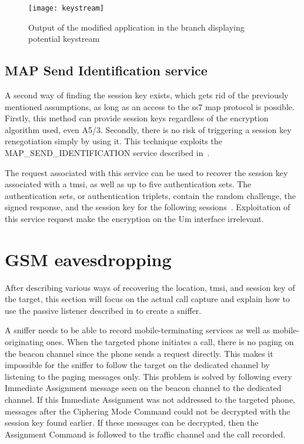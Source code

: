         \begin{figure}[h]
          \centering
          \texttt{[image: keystream]}
          \caption{Output of the modified  application
          in the  branch displaying potential
        keystream}
          \label{fig:keystream}
        \end{figure}

      \subsection{MAP Send Identification service}

        A second way of finding the session key exists, which gets rid of
        the previously mentioned assumptions, as long as an access to
        the \gls{ss7} \gls{map} protocol is possible. Firstly, this
        method can provide session keys regardless of the encryption
        algorithm used, even A5/3. Secondly, there is no risk of
        triggering a session key renegotiation simply by using it. This
        technique exploits the MAP\_SEND\_IDENTIFICATION service described
        in~.

        The request associated with this service can be used to recover
        the session key associated with a \gls{tmsi}, as well as up to
        five authentication sets. The authentication sets, or
        authentication triplets, contain the random challenge, the
        signed response, and the session key for the following
        sessions~\cite[p.~100]{3gpp_ts_2015-1}. Exploitation of this
        service request make the encryption on the Um interface
        irrelevant.

    \section{GSM eavesdropping}

      After describing various ways of recovering the location,
      \gls{tmsi}, and session key of the target, this section will focus
      on the actual call capture and explain how to use the passive
      listener described in  to create a
      sniffer.

      A sniffer needs to be able to record mobile-terminating services
      as well as mobile-originating ones. When the targeted phone
      initiates a call, there is no paging on the beacon channel since
      the phone sends a request directly. This makes it impossible for
      the sniffer to follow the target on the dedicated channel by
      listening to the paging messages only. This problem is solved by
      following every Immediate Assignment message seen on the beacon
      channel to the dedicated channel. If this Immediate Assignment
      was not addressed to the targeted phone, messages after the
      Ciphering Mode Command could not be decrypted with the session key
      found earlier. If these messages can be decrypted, then the
      Assignment Command is followed to the traffic channel and the call
      recorded.

